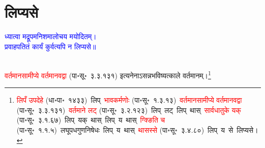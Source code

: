 \section[लिप्यसे]{लिप्यसे}
\centering\textcolor{blue}{ध्यात्वा मद्रूपमनिशमालोचय मयोदितम्।\nopagebreak\\
प्रवाहपतितं कार्यं कुर्वत्यपि न लिप्यसे॥}\nopagebreak\\
\\
\fontsize{14}{21}\selectfont\begin{sloppypar}\justifying\noindent\hspace{10mm} \textcolor{red}{वर्तमान\-सामीप्ये वर्तमानवद्वा} (पा॰सू॰~३.३.१३१) इत्यनेनाऽसन्न\-भविष्यत्काले वर्तमानम्।\footnote{\textcolor{red}{लिपँ उपदेहे} (धा॰पा॰~१४३३)~\arrow लिप्~\arrow \textcolor{red}{भावकर्मणोः} (पा॰सू॰~१.३.१३)~\arrow \textcolor{red}{वर्तमान\-सामीप्ये वर्तमानवद्वा} (पा॰सू॰~३.३.१३१)~\arrow \textcolor{red}{वर्तमाने लट्} (पा॰सू॰~३.२.१२३)~\arrow लिप्~लट्~\arrow लिप्~थास्~\arrow \textcolor{red}{सार्वधातुके यक्} (पा॰सू॰~३.१.६७)~\arrow लिप्~यक्~थास्~\arrow लिप्~य~थास्~\arrow \textcolor{red}{ग्क्ङिति च} (पा॰सू॰~१.१.५)~\arrow लघूपध\-गुण\-निषेधः~\arrow लिप्~य~थास्~\arrow \textcolor{red}{थासस्से} (पा॰सू॰~३.४.८०)~\arrow लिप्~य~से~\arrow लिप्यसे।}\end{sloppypar}
